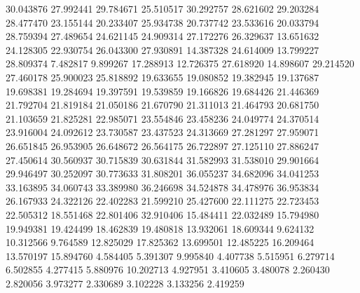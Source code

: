 30.043876
27.992441
29.784671
25.510517
30.292757
28.621602
29.203284
28.477470
23.155144
20.233407
25.934738
20.737742
23.533616
20.033794
28.759394
27.489654
24.621145
24.909314
27.172276
26.329637
13.651632
24.128305
22.930754
26.043300
27.930891
14.387328
24.614009
13.799227
28.809374
7.482817
9.899267
17.288913
12.726375
27.618920
14.898607
29.214520
27.460178
25.900023
25.818892
19.633655
19.080852
19.382945
19.137687
19.698381
19.284694
19.397591
19.539859
19.166826
19.684426
21.446369
21.792704
21.819184
21.050186
21.670790
21.311013
21.464793
20.681750
21.103659
21.825281
22.985071
23.554846
23.458236
24.049774
24.370514
23.916004
24.092612
23.730587
23.437523
24.313669
27.281297
27.959071
26.651845
26.953905
26.648672
26.564175
26.722897
27.125110
27.886247
27.450614
30.560937
30.715839
30.631844
31.582993
31.538010
29.901664
29.946497
30.252097
30.773633
31.808201
36.055237
34.682096
34.041253
33.163895
34.060743
33.389980
36.246698
34.524878
34.478976
36.953834
26.167933
24.322126
22.402283
21.599210
25.427600
22.111275
22.723453
22.505312
18.551468
22.801406
32.910406
15.484411
22.032489
15.794980
19.949381
19.424499
18.462839
19.480818
13.932061
18.609344
9.624132
10.312566
9.764589
12.825029
17.825362
13.699501
12.485225
16.209464
13.570197
15.894760
4.584405
5.391307
9.995840
4.407738
5.515951
6.279714
6.502855
4.277415
5.880976
10.202713
4.927951
3.410605
3.480078
2.260430
2.820056
3.973277
2.330689
3.102228
3.133256
2.419259
